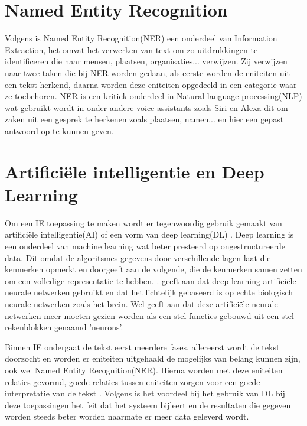 \section{Named Entity Recognition}

Volgens \textcite{Mansouri2008} is Named Entity Recognition(NER) een onderdeel van Information Extraction, het omvat het verwerken van text om zo uitdrukkingen te identificeren die naar mensen, plaatsen, organisaties... verwijzen. Zij verwijzen naar twee taken die bij NER worden gedaan, als eerste worden de eniteiten uit een tekst herkend, daarna worden deze eniteiten opgedeeld in een categorie waar ze toebehoren. NER is een kritiek onderdeel in Natural language processing(NLP) wat gebruikt wordt in onder andere voice assistants zoals Siri en Alexa dit om zaken uit een gesprek te herkenen zoals plaatsen, namen... en hier een gepast antwoord op te kunnen geven. \autocite{Monaikul_2021}

\section{Artificiële intelligentie en Deep Learning}

Om een IE toepassing te maken wordt er tegenwoordig gebruik gemaakt van artificiële intelligentie(AI) of een vorm van deep learning(DL) \autocite{Yang2022}. Deep learning is een onderdeel van machine learning wat beter presteerd op ongestructureerde data. Dit omdat de algoritsmes gegevens door verschillende lagen laat die kenmerken opmerkt en doorgeeft aan de volgende, die de kenmerken samen zetten om een volledige representatie te hebben. \autocite{mathew2021deep}. \textcite{roberts2022principles} geeft aan dat deep learning artificiële neurale netwerken gebruikt en dat het lichtelijk gebaseerd is op echte biologisch neurale netwerken zoals het brein. Wel geeft \textcite{roberts2022principles} aan dat deze artificiële neurale netwerken meer moeten gezien worden als een stel functies gebouwd uit een stel rekenblokken genaamd 'neurons'.

Binnen IE ondergaat de tekst eerst meerdere fases, allereerst wordt de tekst doorzocht en worden er eniteiten uitgehaald de mogelijks van belang kunnen zijn, ook wel Named Entity Recognition(NER). Hierna worden met deze eniteiten relaties gevormd, goede relaties tussen eniteiten zorgen voor een goede interpretatie van de tekst \autocite{Yang2022}. Volgens \textcite{Yang2022} is het voordeel bij het gebruik van DL bij deze toepassingen het feit dat het systeem bijleert en de resultaten die gegeven worden steeds beter worden naarmate er meer data geleverd wordt.

